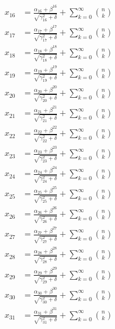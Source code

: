 \documentclass{article}
\begin{document}
\begin{align}
  x_{16} &= \frac{\alpha_{16} + \beta^{16}}{\sqrt{\gamma_{16}^2 + \delta}} + \sum_{k=0}^{\infty} \binom{n}{k} \label{eq:16} \\
  x_{17} &= \frac{\alpha_{17} + \beta^{17}}{\sqrt{\gamma_{17}^2 + \delta}} + \sum_{k=0}^{\infty} \binom{n}{k} \label{eq:17} \\
  x_{18} &= \frac{\alpha_{18} + \beta^{18}}{\sqrt{\gamma_{18}^2 + \delta}} + \sum_{k=0}^{\infty} \binom{n}{k} \label{eq:18} \\
  x_{19} &= \frac{\alpha_{19} + \beta^{19}}{\sqrt{\gamma_{19}^2 + \delta}} + \sum_{k=0}^{\infty} \binom{n}{k} \label{eq:19} \\
  x_{20} &= \frac{\alpha_{20} + \beta^{20}}{\sqrt{\gamma_{20}^2 + \delta}} + \sum_{k=0}^{\infty} \binom{n}{k} \label{eq:20} \\
  x_{21} &= \frac{\alpha_{21} + \beta^{21}}{\sqrt{\gamma_{21}^2 + \delta}} + \sum_{k=0}^{\infty} \binom{n}{k} \label{eq:21} \\
  x_{22} &= \frac{\alpha_{22} + \beta^{22}}{\sqrt{\gamma_{22}^2 + \delta}} + \sum_{k=0}^{\infty} \binom{n}{k} \label{eq:22} \\
  x_{23} &= \frac{\alpha_{23} + \beta^{23}}{\sqrt{\gamma_{23}^2 + \delta}} + \sum_{k=0}^{\infty} \binom{n}{k} \label{eq:23} \\
  x_{24} &= \frac{\alpha_{24} + \beta^{24}}{\sqrt{\gamma_{24}^2 + \delta}} + \sum_{k=0}^{\infty} \binom{n}{k} \label{eq:24} \\
  x_{25} &= \frac{\alpha_{25} + \beta^{25}}{\sqrt{\gamma_{25}^2 + \delta}} + \sum_{k=0}^{\infty} \binom{n}{k} \label{eq:25} \\
  x_{26} &= \frac{\alpha_{26} + \beta^{26}}{\sqrt{\gamma_{26}^2 + \delta}} + \sum_{k=0}^{\infty} \binom{n}{k} \label{eq:26} \\
  x_{27} &= \frac{\alpha_{27} + \beta^{27}}{\sqrt{\gamma_{27}^2 + \delta}} + \sum_{k=0}^{\infty} \binom{n}{k} \label{eq:27} \\
  x_{28} &= \frac{\alpha_{28} + \beta^{28}}{\sqrt{\gamma_{28}^2 + \delta}} + \sum_{k=0}^{\infty} \binom{n}{k} \label{eq:28} \\
  x_{29} &= \frac{\alpha_{29} + \beta^{29}}{\sqrt{\gamma_{29}^2 + \delta}} + \sum_{k=0}^{\infty} \binom{n}{k} \label{eq:29} \\
  x_{30} &= \frac{\alpha_{30} + \beta^{30}}{\sqrt{\gamma_{30}^2 + \delta}} + \sum_{k=0}^{\infty} \binom{n}{k} \label{eq:30} \\
  x_{31} &= \frac{\alpha_{31} + \beta^{31}}{\sqrt{\gamma_{31}^2 + \delta}} + \sum_{k=0}^{\infty} \binom{n}{k} \label{eq:31} \\

\end{align}
\end{document}
